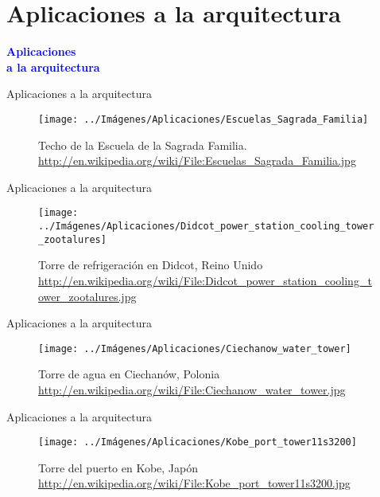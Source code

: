 \documentclass[10pt]{beamer}
\begin{document}
	
	\section{Aplicaciones a la arquitectura}
	
	\begin{frame}
		\begin{center}
			\Huge\textbf{\textsf{\textcolor{blue}{Aplicaciones \\ a la arquitectura}}}
		\end{center}
	\end{frame}

	\begin{frame}{Aplicaciones a la arquitectura}	
		\begin{figure}
			\centering
			\texttt{[image: ../Imágenes/Aplicaciones/Escuelas\_Sagrada\_Familia]}
			\caption{Techo de la Escuela de la Sagrada Familia. \url{http://en.wikipedia.org/wiki/File:Escuelas_Sagrada_Familia.jpg}}
			\label{fig:Sagrada-familia}
		\end{figure}	
	\end{frame}
	
	\begin{frame}{Aplicaciones a la arquitectura}	
		\begin{figure}
			\centering
			\texttt{[image: ../Imágenes/Aplicaciones/Didcot\_power\_station\_cooling\_tower\_zootalures]}
			\caption{Torre de refrigeración en Didcot, Reino Unido \url{http://en.wikipedia.org/wiki/File:Didcot_power_station_cooling_tower_zootalures.jpg}}
			\label{fig:Didicot}
		\end{figure}	
	\end{frame}
	
	\begin{frame}{Aplicaciones a la arquitectura}	
		\begin{figure}
			\centering
			\texttt{[image: ../Imágenes/Aplicaciones/Ciechanow\_water\_tower]}
			\caption{Torre de agua en Ciechanów, Polonia \url{http://en.wikipedia.org/wiki/File:Ciechanow_water_tower.jpg}}
			\label{fig:torre-agua}
		\end{figure}	
	\end{frame}
	
	\begin{frame}{Aplicaciones a la arquitectura}	
		\begin{figure}
			\centering
			\texttt{[image: ../Imágenes/Aplicaciones/Kobe\_port\_tower11s3200]}
			\caption{Torre del puerto en Kobe, Japón \url{http://en.wikipedia.org/wiki/File:Kobe_port_tower11s3200.jpg}}
			\label{fig:torre-japon}
		\end{figure}	
	\end{frame}
	
\end{document}
